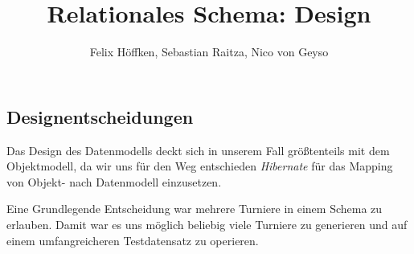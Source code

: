 \documentclass[11pt,german]{scrartcl}
\title{Relationales Schema: Design}
\author{Felix Höffken, Sebastian Raitza, Nico von Geyso}
\date{}
\begin{document}
\renewcommand{\labelenumi}{\alph{enumi})}
\renewcommand{\labelenumii}{$\bullet$}





\maketitle

\subsection*{Designentscheidungen}
Das Design des Datenmodells deckt sich in unserem Fall größtenteils mit dem Objektmodell, da wir uns für den Weg entschieden \emph{Hibernate} für das Mapping von Objekt- nach Datenmodell einzusetzen.

Eine Grundlegende Entscheidung war mehrere Turniere in einem Schema zu erlauben. Damit war es uns möglich beliebig viele Turniere zu generieren und auf einem umfangreicheren Testdatensatz zu operieren.
\end{document}
